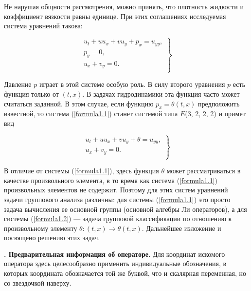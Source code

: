 \documentclass[twoside]{article}
\newcounter{nrazd}
\newcommand{\razd}[1]
{
  \addtocounter{nrazd}{1} 
  \setcounter{equation}{0} 
  \textbf{\thenrazd. #1} 
}
\begin{document}
    Не нарушая общности рассмотрения, можно принять, что плотность жидкости и коэффициент вязкости равны единице. При этих соглашениях исследуемая система уравнений такова:

    \begin{equation}\label{formula1.1}
      \left.
      \begin{array}{rl}
        u_t+uu_x+vu_y+p_x  =  u_{yy}, \\
        p_y  =  0, \\
        u_x+v_y=0.\\
      \end{array}
      \right\}
    \end{equation}

    Давление $p$ играет в этой системе особую роль. В силу второго уравнения $p$ есть функция только от $(t, x)$. В задачах гидродинамики эта функция часто может считаться заданной. В этом случае, если функцию $p_x=\theta(t, x)$ предположить известной, то система (\ref{formula1.1}) станет системой типа $E$(3, 2, 2, 2) и примет вид
    
    \begin{equation}\label{formula1.2}
      \left.
      \begin{array}{rl}
        u_t+uu_x+vu_y+\theta  =  u_{yy}, \\
        u_x+v_y=0.\\
      \end{array}
      \right\}
    \end{equation}

    В отличие от системы (\ref{formula1.1}), здесь функция $\theta$ может рассматриваться в качестве произвольного элемента, в то время как система (\ref{formula1.1}) произвольных элементов не содержит. Поэтому для этих систем уравнений задачи группового анализа различны: для системы (\ref{formula1.1}) это просто задача вычисления ее основной группы (основной алгебры Ли операторов), а для системы (\ref{formula1.2}) — задача групповой классификации по отношению к произвольному элементу $\theta: (t, x) \rightarrow \theta(t, x)$. Дальнейшее изложение и посвящено решению этих задач.
    
      \razd{Предварительная информация об операторе.} Для координат искомого оператора здесь целесообразно применить индивидуальные обозначения, в которых координата обозначается той же буквой, что и скалярная переменная, но со звездочкой наверху.
\end{document}
